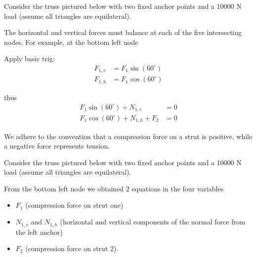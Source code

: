 \begin{applicationActivities}
\begin{observation}
Consider the truss pictured below with two fixed anchor points and a 10000 N load (assume all triangles are equilateral).
\drawtruss

The horizontal and vertical forces must balance at each of the five intersecting nodes.  For example, at the bottom left node
\begin{multicols}{4}


Apply basic trig:
\begin{align*}
F_{1,v}&=F_1 \sin(60^\circ) \\ F_{1,h}&=F_1\cos(60^\circ)
\end{align*}

thus
\begin{align*}
F_1 \sin(60^\circ)+N_{1,v} &= 0 \\
F_1 \cos(60^\circ)+N_{1,h}+F_2 &= 0
\end{align*}
\end{multicols}

We adhere to the convention that a compression force on a strut is positive, while a negative force represents tension.
\end{observation}

\begin{activity}{10}
Consider the truss pictured below with two fixed anchor points and a 10000 N load (assume all triangles are equilateral).
\drawtruss

From the bottom left node we obtained 2 equations in the four variables
\begin{itemize}
\item $F_{1}$ (compression force on strut one)
\item $N_{1,v}$ and $N_{1,h}$ (horizontal and vertical components of the normal force from the left anchor)
\item $F_2$ (compression force on strut 2).
\end{itemize}


\end{activity}
\end{applicationActivities}
